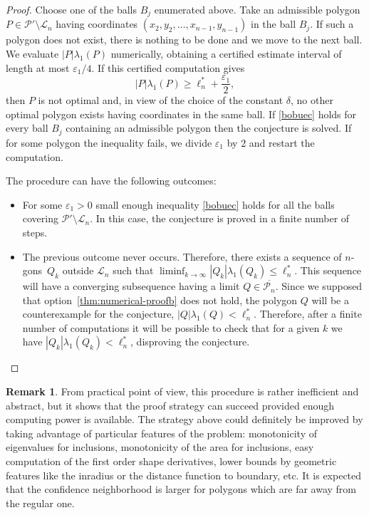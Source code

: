 \documentclass[JEP,XML,SOM,Unicode,ThmDefs,NoFloatCountersInSection,published]{cedram}
\theoremstyle{plain}
\theoremstyle{definition}
\newtheorem{rem}[thm]{Remark}
\newcommand{\vps}{\varepsilon}
\newcommand{\lb}{\lambda}
\newcommand{\sm}{\setminus}
\begin{document}
\begin{proof}
Choose one of the balls $B_j$ enumerated above. Take an admissible polygon $P\in \mathcal P'\sm \mathcal L_n$ having coordinates $(x_2,y_2,\dots,x_{n-1},y_{n-1})$ in the ball $B_j$. If such a polygon does not exist, there is nothing to be done and we move to the next ball. We evaluate $|P|\lb_1(P)$ numerically, obtaining a certified estimate interval of length at most $\varepsilon_1/4$. If this certified computation gives
\begin{equation}\label{bobuec}
|P|\lb_1(P)\ge \ell_n^*+ \frac{\vps_1}{2},
\end{equation}
then $P$ is not optimal and, in view of the choice of the constant $\delta$, no other optimal polygon exists having coordinates in the same ball. If \eqref{bobuec} holds for every ball $B_j$ containing an admissible polygon then the conjecture is solved.
If for some polygon the inequality fails, we divide $\vps_1$ by $2$ and restart the computation.

The procedure can have the following outcomes:

\begin{itemize}
\item For some $\varepsilon_1>0$ small enough inequality \eqref{bobuec} holds for all the balls covering $\mathcal P'\setminus \mathcal L_n$. In this case, the conjecture is proved in a finite number of steps.
\item The previous outcome never occurs. Therefore, there exists a sequence of $n$\nobreakdash-gons~$Q_k$ outside $\mathcal L_n$ such that $\liminf_{k \to \infty}|Q_k|\lambda_1(Q_k) \leq \ell_n^*$. This sequence will have a converging subsequence having a limit $Q \in \overline{\mathcal P_n}$. Since we supposed that option~\eqref{thm:numerical-proofb} does not hold, the polygon $Q$ will be a counterexample for the conjecture, \ie $|Q|\lambda_1(Q)<\ell_n^*$. Therefore, after a finite number of computations it will be possible to check that for a given $k$ we have $|Q_k|\lambda_1(Q_k)<\ell_n^*$, disproving the conjecture.\qedhere
\end{itemize}
\end{proof}

\begin{rem}
From practical point of view, this procedure is rather inefficient and abstract, but it shows that the proof strategy can succeed provided enough computing power is available.
The strategy above could definitely be improved by taking advantage of particular features of the problem: monotonicity of eigenvalues for inclusions, monotonicity of the area for inclusions, easy computation of the first order shape derivatives, lower bounds by geometric features like the inradius or the distance function to boundary, etc. It is expected that the confidence neighborhood is larger for polygons which are far away from the regular one.
\end{rem}
\end{document}
